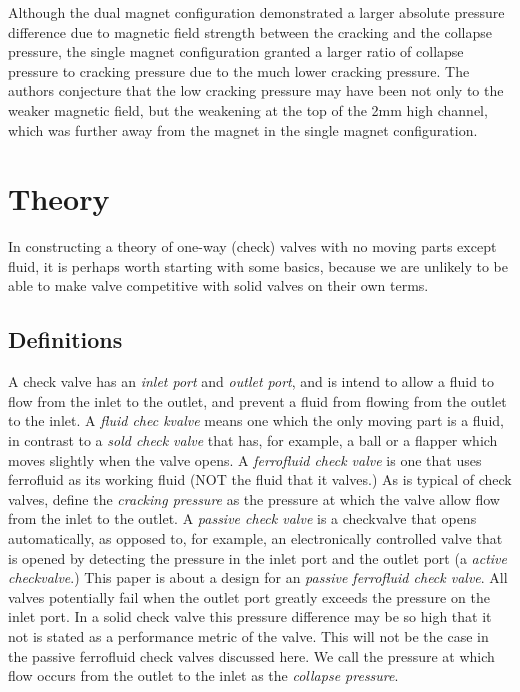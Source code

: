 \documentclass{asme2ej}
\begin{document}
Although the dual magnet configuration demonstrated a larger absolute
pressure difference due to magnetic field strength between the
cracking and the collapse pressure, the single magnet configuration
granted a larger ratio of collapse pressure to cracking
pressure due to the much lower cracking pressure.
The authors conjecture that the low cracking pressure may have
been not only to the weaker magnetic field, but the weakening at the
top of the 2mm high channel, which was further away from the magnet
in the single magnet configuration.


\section{Theory}

In constructing a theory of one-way (check) valves with no moving parts except fluid,
it is perhaps worth starting with some basics, because we are unlikely to
be able to make valve competitive with solid valves on their own terms.

\subsection{Definitions}

A check valve has an {\em inlet port} and {\em outlet port}, and is intend to
allow a fluid to flow from the inlet to the outlet, and prevent a fluid from
flowing from the outlet to the inlet.
A {\em fluid chec kvalve} means one which the only moving part is a fluid, in
contrast to a {\em sold check valve} that has, for example, a ball or a flapper
which moves slightly when the valve opens. A {\em ferrofluid check valve} is one
that uses ferrofluid as its working fluid (NOT the fluid that it valves.)
As is typical of check valves, define the {\em cracking pressure} as the
pressure at which the valve allow flow from the inlet to the outlet.
A {\em passive check valve} is a checkvalve that opens automatically,
as opposed to, for example,  an electronically controlled valve that is
opened by detecting the pressure in the inlet port and the outlet port (a {\em active checkvalve}.)
This paper is about a design for an {\em passive ferrofluid check valve}.
All valves potentially fail when the outlet port greatly exceeds the pressure
on the inlet port. In a solid check valve this pressure difference may be
so high that it not is stated as a performance metric of the valve. This will
not be the case in the passive ferrofluid check valves discussed here.
We call the pressure at which flow occurs from the outlet to the inlet as
the {\em collapse pressure}.
\end{document}
